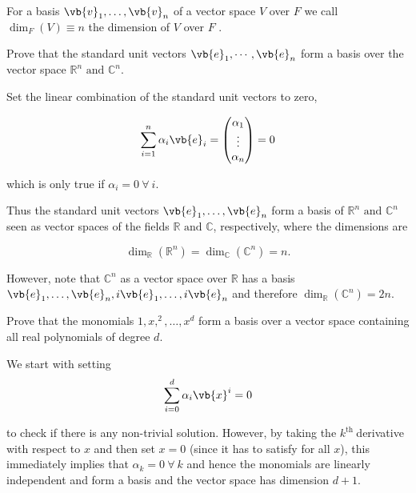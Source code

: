 \documentclass[a4paper,12pt]{report}
\begin{document}
\begin{definition} \label{dimension} 
For a basis \(\vb{v}_{1}, \ldots, \vb{v}_n \) of a vector space \(V\) over \(F\) we call \(\dim _{F} (V) \equiv n \) the dimension of \(V\) over \(F\) . 
\end{definition}

{Prove that the standard unit vectors \(\vb{e}_1, \cdots, \vb{e}_n \) form a basis over the vector space \(\mathbb{R}^{n} \text { and } \mathbb{C}^{n} \). }
{Set the linear combination of the standard unit vectors to zero, 

\begin{equation}
    \sum_{i=1}^{n} \alpha _{i} \vb{e} _{i} = \begin{pmatrix}
         \alpha _{1}  \\
         \vdots  \\
         \alpha _{n}  \\
    \end{pmatrix} =0
\end{equation}

which is only true if \(\alpha _{i} = 0 ~ \forall ~ i\).

Thus the standard unit vectors \(\vb{e}_{1}, \ldots, \vb{e}_n \) form a basis of \(\mathbb{R}^{n} \text { and } \mathbb{C}^{n}  \) seen as vector spaces of the fields \(\mathbb{R}\text { and } \mathbb{C}\), respectively, where the dimensions are 

\begin{equation}
    \dim _{\mathbb{R}} (\mathbb{R}^{n} ) = \dim _{\mathbb{C}} (\mathbb{C}^{n} ) = n. 
\end{equation}

However, note that \(\mathbb{C}^{n} \) as a vector space over \(\mathbb{R}\) has a basis \(\vb{e}_{1}, \ldots, \vb{e}_n, i \vb{e} _{1}, \ldots , i \vb{e} _{n}   \) and therefore \(\dim _{\mathbb{R}} (\mathbb{C}^{n} ) = 2n\). 
} 

{Prove that the monomials \(1,x,^2,\ldots ,x^{d} \) form a basis over a vector space containing all real polynomials of degree \(d\).}
{We start with setting  
\begin{equation}
    \sum_{i=0}^{d} \alpha _{i} \vb{x} ^{i} =0 
\end{equation}

to check if there is any non-trivial solution. However, by taking the \(k^{\text{th }} \)derivative with respect to \(x\) and then set \(x=0\) (since it has to satisfy for all \(x\)), this immediately implies that \(\alpha _{k} = 0 ~ \forall ~  k\) and hence the monomials are linearly independent and form a basis and the vector space has dimension \(d+1\).
}
\end{document}
